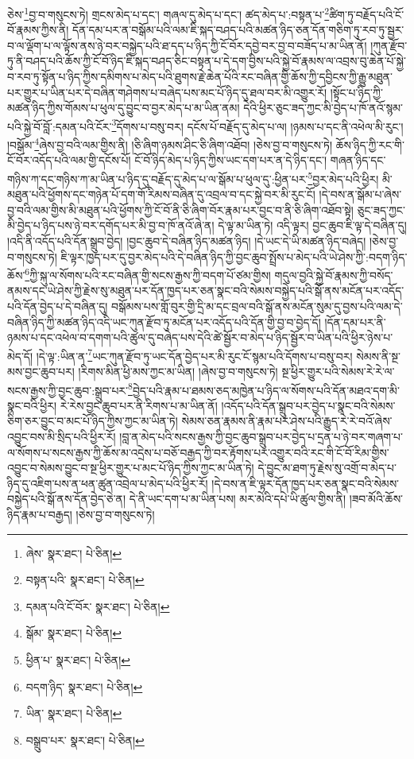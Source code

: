 ཅེས་\footnote{ཞེས་  སྣར་ཐང་།  པེ་ཅིན། }བྱ་བ་གསུངས་ཏེ། གྲངས་མེད་པ་དང་། གཞལ་དུ་མེད་པ་དང་། ཚད་མེད་པ་:བསྟན་པ་\footnote{བསྟན་པའི་  སྣར་ཐང་།  པེ་ཅིན། }ཚིག་ཏུ་བརྗོད་པའི་ངོ་བོ་རྣམས་ཀྱིས་ནི། དོན་དམ་པར་ན་བསྒོམ་པའི་ལམ་ཇི་སྐད་བཤད་པའི་མཚན་ཉིད་ཅན་དོན་གཅིག་ཏུ་རབ་ཏུ་སྦྱར་བ་ལ་ལྡོག་པ་ལ་ལྟོས་ནས་ཉེ་བར་བསྐྱེད་པའི་ཐ་དད་པ་ཉིད་ཀྱི་ངོ་བོར་དབྱེ་བར་བྱ་བ་བཟོད་པ་མ་ཡིན་ནོ། །ཀུན་རྫོབ་ཏུ་ནི་བཤད་པའི་ཆོས་ཀྱི་ངོ་བོ་ཉིད་ཇི་སྐད་བཤད་ཅིང་བསྟན་པ་དེ་དག་བྱིས་པའི་སྐྱེ་བོ་རྣམས་ལ་འབྲས་བུ་ཆེན་པོ་སྐྱེ་བ་རབ་ཏུ་སྟོན་པ་ཉིད་ཀྱིས་དམིགས་པ་མེད་པའི་ཐུགས་རྗེ་ཆེན་པོའི་རང་བཞིན་གྱི་ཆོས་ཀྱི་དབྱིངས་ཀྱི་རྒྱུ་མཐུན་པར་གྱུར་པ་ཡིན་པར་དེ་བཞིན་གཤེགས་པ་བཞེད་པས་མང་པོ་ཉིད་དུ་ཐལ་བར་མི་འགྱུར་རོ། །སྟོང་པ་ཉིད་ཀྱི་མཚན་ཉིད་ཀྱིས་གོམས་པ་ཕུལ་དུ་བྱུང་བ་བྱར་མེད་པ་མ་ཡིན་ནམ། དེའི་ཕྱིར་ཅུང་ཟད་ཀྱང་མི་བྱེད་པ་ཁོ་ནའོ་སྙམ་པའི་སྐྱེ་བོ་བློ་:དམན་པའི་ངོར་\footnote{དམན་པའི་ངོ་བོར་  སྣར་ཐང་།  པེ་ཅིན། }དོགས་པ་བསུ་བར། དངོས་པོ་བརྗོད་དུ་མེད་པ་ལ། །ཉམས་པ་དང་ནི་འཕེལ་མི་རུང་། །བསྒོམ་\footnote{སྒོམ་  སྣར་ཐང་།  པེ་ཅིན། }ཞེས་བྱ་བའི་ལམ་གྱིས་ནི། །ཅི་ཞིག་ཉམས་ཤིང་ཅི་ཞིག་འཐོབ། །ཅེས་བྱ་བ་གསུངས་ཏེ། ཆོས་ཉིད་ཀྱི་རང་གི་ངོ་བོར་འདོད་པའི་ལམ་གྱི་དངོས་པོ། ངོ་བོ་ཉིད་མེད་པ་ཉིད་ཀྱིས་ཡང་དག་པར་ན་དེ་ཉིད་དང་། གཞན་ཉིད་དང་གཉིས་ཀ་དང་གཉིས་ཀ་མ་ཡིན་པ་ཉིད་དུ་བརྗོད་དུ་མེད་པ་ལ་སྒོམ་པ་ཕུལ་དུ་:ཕྱིན་པར་\footnote{ཕྱིན་པ་  སྣར་ཐང་།  པེ་ཅིན། }བྱར་མེད་པའི་ཕྱིར། མི་མཐུན་པའི་ཕྱོགས་དང་གཉེན་པོ་དག་གོ་རིམས་བཞིན་དུ་འབྲལ་བ་དང་སྐྱེ་བར་མི་རུང་ངོ། །དེ་བས་ན་སྒོམ་པ་ཞེས་བྱ་བའི་ལམ་གྱིས་མི་མཐུན་པའི་ཕྱོགས་ཀྱི་ངོ་བོ་ནི་ཅི་ཞིག་བོར་རྣམ་པར་བྱང་བ་ནི་ཅི་ཞིག་འཐོབ་སྟེ། ཅུང་ཟད་ཀྱང་མི་བྱེད་པ་ཉིད་པས་ཉེ་བར་དགོད་པར་མི་བྱ་བ་ཁོ་ནའོ་ཞེ་ན། དེ་ལྟ་མ་ཡིན་ཏེ། འདི་ལྟར། བྱང་ཆུབ་ཇི་ལྟ་དེ་བཞིན་དུ། །འདི་ནི་འདོད་པའི་དོན་སྒྲུབ་བྱེད། །བྱང་ཆུབ་དེ་བཞིན་ཉིད་མཚན་ཉིད། །དེ་ཡང་དེ་ཡི་མཚན་ཉིད་བཞེད། །ཅེས་བྱ་བ་གསུངས་ཏེ། ཇི་ལྟར་ཁྱད་པར་དུ་བྱར་མེད་པའི་དེ་བཞིན་ཉིད་ཀྱི་བྱང་ཆུབ་སྤྲོས་པ་མེད་པའི་ཡེ་ཤེས་ཀྱི་:བདག་ཉིད་ཆོས་\footnote{བདག་ཉིད་  སྣར་ཐང་།  པེ་ཅིན། }ཀྱི་སྐུ་ལ་སོགས་པའི་རང་བཞིན་གྱི་སངས་རྒྱས་ཀྱི་བདག་པོ་ཙམ་གྱིས། གདུལ་བྱའི་སྐྱེ་བོ་རྣམས་ཀྱི་བསོད་ནམས་དང་ཡེ་ཤེས་ཀྱི་རྗེས་སུ་མཐུན་པར་དོན་ཁྱད་པར་ཅན་སྣང་བའི་སེམས་བསྐྱེད་པའི་སྒོ་ནས་མངོན་པར་འདོད་པའི་དོན་བྱེད་པ་དེ་བཞིན་དུ། བསྒོམས་པས་གློ་བུར་གྱི་དྲི་མ་དང་བྲལ་བའི་སྒོ་ནས་མངོན་སུམ་དུ་བྱས་པའི་ལམ་དེ་བཞིན་ཉིད་ཀྱི་མཚན་ཉིད་འདི་ཡང་ཀུན་རྫོབ་ཏུ་མངོན་པར་འདོད་པའི་དོན་གྱི་བྱ་བ་བྱེད་དོ། །དོན་དམ་པར་ནི་ཉམས་པ་དང་འཕེལ་བ་དགག་པའི་ཚུལ་དུ་བཞེད་པས་དེའི་ཚེ་སྦྱོར་བ་མེད་པ་ཉིད་སྦྱོར་བ་ཡིན་པའི་ཕྱིར་ཉེས་པ་མེད་དོ། །དེ་ལྟ་:ཡིན་ན་\footnote{ཡིན་  སྣར་ཐང་།  པེ་ཅིན། }ཡང་ཀུན་རྫོབ་ཏུ་ཡང་དོན་བྱེད་པར་མི་རུང་ངོ་སྙམ་པའི་དོགས་པ་བསུ་བར། སེམས་ནི་སྔ་མས་བྱང་ཆུབ་པར། །རིགས་མིན་ཕྱི་མས་ཀྱང་མ་ཡིན། །ཞེས་བྱ་བ་གསུངས་ཏེ། སྔ་ཕྱིར་གྱུར་པའི་སེམས་རེ་རེ་ལ་སངས་རྒྱས་ཀྱི་བྱང་ཆུབ་:སྒྲུབ་པར་\footnote{བསྒྲུབ་པར་  སྣར་ཐང་།  པེ་ཅིན། }བྱེད་པའི་རྣམ་པ་ཐམས་ཅད་མཁྱེན་པ་ཉིད་ལ་སོགས་པའི་དོན་མཐའ་དག་མི་སྣང་བའི་ཕྱིར། རེ་རེས་བྱང་ཆུབ་པར་ནི་རིགས་པ་མ་ཡིན་ནོ། །འདོད་པའི་དོན་སྒྲུབ་པར་བྱེད་པ་སྣང་བའི་སེམས་ཅིག་ཅར་བྱུང་བ་མང་པོ་ཉིད་ཀྱིས་ཀྱང་མ་ཡིན་ཏེ། སེམས་ཅན་རྣམས་ནི་རྣམ་པར་ཤེས་པའི་རྒྱུད་རེ་རེ་བའོ་ཞེས་འབྱུང་བས་མི་སྲིད་པའི་ཕྱིར་རོ། །བླ་ན་མེད་པའི་སངས་རྒྱས་ཀྱི་བྱང་ཆུབ་སྒྲུབ་པར་བྱེད་པ་དྲན་པ་ཉེ་བར་གཞག་པ་ལ་སོགས་པ་སངས་རྒྱས་ཀྱི་ཆོས་མ་འདྲེས་པ་བཅོ་བརྒྱད་ཀྱི་བར་རྟོགས་པར་འགྱུར་བའི་རང་གི་ངོ་བོ་རིམ་གྱིས་འབྱུང་བ་སེམས་བྱུང་བ་སྔ་ཕྱིར་གྱུར་པ་མང་པོ་ཉིད་ཀྱིས་ཀྱང་མ་ཡིན་ཏེ། དེ་བྱུང་མ་ཐག་ཏུ་རྗེས་སུ་འགྲོ་བ་མེད་པ་ཉིད་དུ་འཇིག་པས་ན་ཕན་ཚུན་འབྲེལ་པ་མེད་པའི་ཕྱིར་རོ། །དེ་བས་ན་ཇི་ལྟར་དོན་ཁྱད་པར་ཅན་སྣང་བའི་སེམས་བསྐྱེད་པའི་སྒོ་ནས་དོན་བྱེད་ཅེ་ན། དེ་ནི་ཡང་དག་པ་མ་ཡིན་པས། མར་མེའི་དཔེ་ཡི་ཚུལ་གྱིས་ནི། །ཟབ་མོའི་ཆོས་ཉིད་རྣམ་པ་བརྒྱད། །ཅེས་བྱ་བ་གསུངས་ཏེ། 